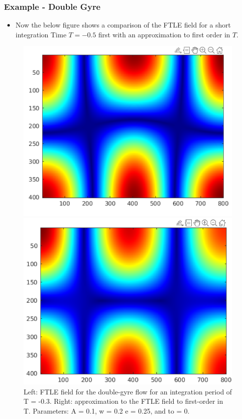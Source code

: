 \documentclass[../presentation.tex]{subfiles}
\begin{document}
\begin{frame}
  \frametitle{Example - Double Gyre}

  \begin{itemize}
    \item Now the below figure shows a comparison of the FTLE field for a short integration Time \(T = -0.5\) first with an approximation to first order in \(T\).
  \end{itemize}

  \begin{figure}[H]
    \centering
    \begin{minipage}{.5\textwidth}
        \centering
        \includegraphics[width=\linewidth]{images/image_3-2.png}
    \end{minipage}%
    \begin{minipage}{0.5\textwidth}
        \centering
        \includegraphics[width=\linewidth]{images/image_3-1.png}
    \end{minipage}
    \caption{\tiny Left: FTLE field for the double-gyre flow for an integration period of T = -0.3. Right: approximation to the FTLE field to first-order in T. Parameters: A = 0.1, w = 0.2 e = 0.25, and to = 0.}
    \label{fig:fig_3}
  \end{figure}
\end{frame}
\end{document}
